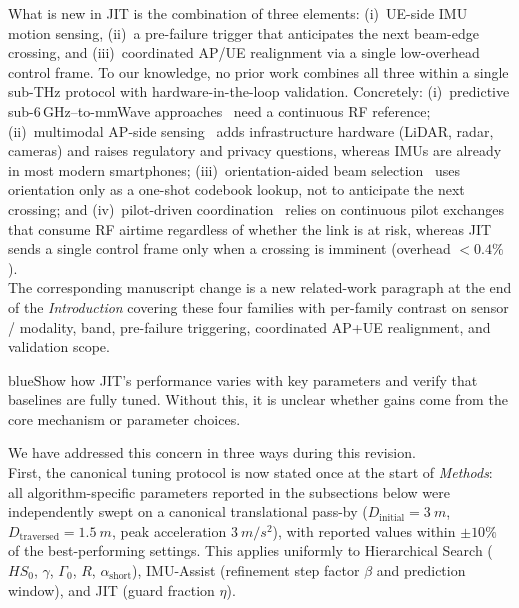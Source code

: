 \documentclass{article}
\newcommand{\blue}[1]{\begin{color}{blue}#1\end{color}}
\begin{document}
\noindent What is new in JIT is the combination of three elements: (i)~UE-side IMU motion sensing, (ii)~a pre-failure trigger that anticipates the next beam-edge crossing, and (iii)~coordinated AP/UE realignment via a single low-overhead control frame. To our knowledge, no prior work combines all three within a single sub-THz protocol with hardware-in-the-loop validation. Concretely: (i)~predictive sub-6\,GHz–to-mmWave approaches~\cite{Alrabeiah2020DeepLearning} need a continuous RF reference; (ii)~multimodal AP-side sensing~\cite{Alkhateeb2023DeepSense, Jiang2023LiDAR, Morais2023Position} adds infrastructure hardware (LiDAR, radar, cameras) and raises regulatory and privacy questions, whereas IMUs are already in most modern smartphones; (iii)~orientation-aided beam selection~\cite{Rezaie2022Orientation, Struye2023CoVRage} uses orientation only as a one-shot codebook lookup, not to anticipate the next crossing; and (iv)~pilot-driven coordination~\cite{Alkhateeb2018DLCB, Xue2023Standardization} relies on continuous pilot exchanges that consume RF airtime regardless of whether the link is at risk, whereas JIT sends a single control frame only when a crossing is imminent (overhead $<0.4\%$).\\

\noindent The corresponding manuscript change is a new related-work paragraph at the end of the \emph{Introduction} covering these four families with per-family contrast on sensor / modality, band, pre-failure triggering, coordinated AP+UE realignment, and validation scope.

\begin{tcbremark}
{\selectfont
\blue{Show how JIT's performance varies with key parameters and verify that baselines are fully tuned. Without this, it is unclear whether gains come from the core mechanism or parameter choices.}
}
\end{tcbremark}

\noindent We have addressed this concern in three ways during this revision.\\

\noindent First, the canonical tuning protocol is now stated once at the start of \emph{Methods}: all algorithm-specific parameters reported in the subsections below were independently swept on a canonical translational pass-by ($D_{\text{initial}} = \SI{3}{m}$, $D_{\text{traversed}} = \SI{1.5}{m}$, peak acceleration $\SI{3}{m/s^2}$), with reported values within $\pm10\%$ of the best-performing settings. This applies uniformly to Hierarchical Search ($HS_0$, $\gamma$, $\Gamma_0$, $R$, $\alpha_{\text{short}}$), IMU-Assist (refinement step factor $\beta$ and prediction window), and JIT (guard fraction $\eta$).\\
\end{document}
